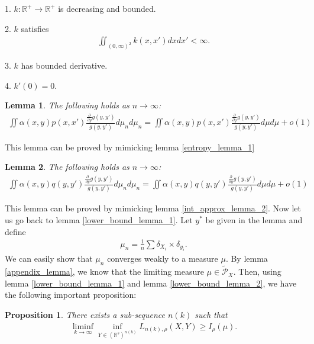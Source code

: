 \documentclass[10pt]{article}
\newtheorem{lemma}{\bf Lemma}
\newtheorem{proposition}{\bf Proposition}
\newenvironment{Proof of lemma}{\noindent{\bf Proof of Lemma}}{\hfill$\Box$\newline}
\newenvironment{Proof of claim}{\noindent{\bf Proof of claim}}{\hfill$\Box$\newline}
\newenvironment{Proof of theorem}{\noindent{\bf Proof of Theorem}}{\hfill\scriptsize{$\Box$}\newline}
\newenvironment{Proof of theorems}{\noindent{\bf Proof of Theorems}}{\hfill$\Box$\newline}
\newenvironment{Proof of proposition}{\noindent{\bf Proof of Proposition}}{\hfill$\Box$\newline}
\newenvironment{Proof of propositions}{\noindent{\bf Proof of Propositions}}{\hfill$\Box$\newline}
\newenvironment{Proof of exercise}{\noindent{\it Proof of Exercise:}}{\hfill$\Box$}
\numberwithin{equation}{section}
\begin{document}
1. $k: \mathbb{R}^+ \to \mathbb{R}^+$ is decreasing and bounded.

2. $k$ satisfies
\begin{align}
    \iint_{(0,\infty)^2} k(x,x') dxdx' < \infty.
\end{align}

3. $k$ has bounded derivative.

4. $k'(0) = 0$.
\begin{lemma} \label{appendix_lemma_1}
    The following holds as $n \to \infty$:
    \begin{align}
        \iint \alpha(x,y)p(x,x') \frac{\frac{\partial}{\partial y}g(y,y')}{g(y,y')} d\mu_n d\mu_n = \iint \alpha(x,y)p(x,x') \frac{\frac{\partial}{\partial y}g(y,y')}{g(y,y')} d\mu d\mu + o(1)
    \end{align}
\end{lemma}
This lemma can be proved by mimicking lemma \ref{entropy_lemma_1}
\begin{lemma} \label{appendix_lemma_2}
    The following holds as $n \to \infty$:
    \begin{align}
        \iint \alpha(x,y)q(y,y') \frac{\frac{\partial}{\partial y}g(y,y')}{g(y,y')} d\mu_n d\mu_n = \iint \alpha(x,y)q(y,y') \frac{\frac{\partial}{\partial y}g(y,y')}{g(y,y')} d\mu d\mu + o(1)
    \end{align}
\end{lemma}
This lemma can be proved by mimicking lemma \ref{int_approx_lemma_2}. Now let us go back to lemma \ref{lower_bound_lemma_1}. Let $y^*$ be given in the lemma and define
\begin{align}
    \mu_n = \frac{1}{n} \sum \delta_{X_i} \times \delta_{y_i}.
\end{align}
We can easily show that $\mu_n$ converges weakly to a measure $\mu$. By lemma \ref{appendix_lemma}, we know that the limiting measure $\mu \in \tilde{\mathcal{P}}_X$. Then, using lemma \ref{lower_bound_lemma_1} and lemma \ref{lower_bound_lemma_2}, we have the following important proposition:
\begin{proposition} \label{lower_bound_prop}
    There exists a sub-sequence $n(k)$ such that
    \begin{align}
        \liminf_{k \to \infty} \inf_{Y \in (\mathbb{R}^s)^{n(k)}} L_{n(k),\rho}(X,Y) \geq I_{\rho}(\mu).
    \end{align}
\end{proposition}
\end{document}
